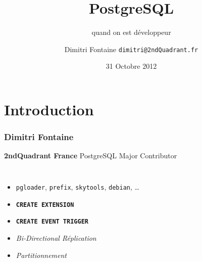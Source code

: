 \documentclass{beamer}
\title{PostgreSQL}
\subtitle{quand on est développeur}
\author{Dimitri Fontaine \texttt{dimitri@2ndQuadrant.fr}}
\date{31 Octobre 2012}
\begin{document}
\frame{\titlepage}

\section{Introduction}

\begin{frame}[fragile]
  \frametitle{Dimitri Fontaine}

  \begin{center}
    \textbf{2ndQuadrant France}
    \linebreak
    PostgreSQL Major Contributor
  \end{center}
  \linebreak

\begin{columns}[c]

  \begin{itemize}
   \item<2-> \texttt{pgloader}, \texttt{prefix}, \texttt{skytools}, \texttt{debian}, …
   \item<2-> \texttt{\textbf{CREATE EXTENSION}}
   \item<3-> \texttt{\textbf{CREATE EVENT TRIGGER}}
   \item<3-> \textit{Bi-Directional Réplication}
   \item<4-> \textit{Partitionnement}
  \end{itemize}  

\end{columns}
\end{frame}
\end{document}
